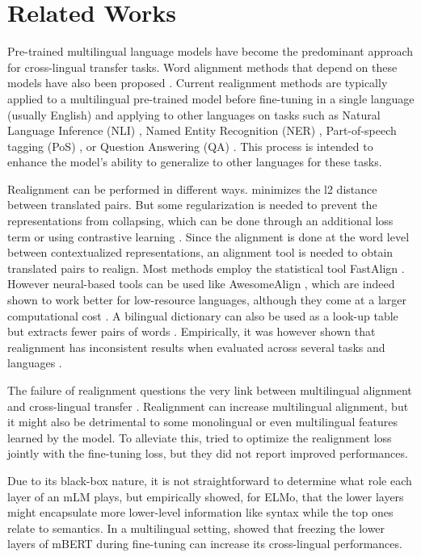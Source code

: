 \section{Related Works}
Pre-trained multilingual language models have become the predominant approach for cross-lingual transfer tasks. Word alignment methods that depend on these models have also been proposed \citep{jalili-sabet-etal-2020-simalign, nagata-etal-2020-supervised}. Current realignment methods are typically applied to a multilingual pre-trained model before fine-tuning in a single language (usually English) and applying to other languages on tasks such as Natural Language Inference (NLI) \citep{conneau-etal-2018-xnli}, Named Entity Recognition (NER) \citep{rahimi-etal-2019-massively}, Part-of-speech tagging (PoS) \citep{daniel2020universal}, or Question Answering (QA) \citep{artetxe-etal-2020-cross}. This process is intended to enhance the model's ability to generalize to other languages for these tasks.


Realignment can be performed in different ways. \citet{Cao2020Multilingual} minimizes the l2 distance between translated pairs. But some regularization is needed to prevent the representations from collapsing, which can be done through an additional loss term \citep{Cao2020Multilingual,zhao-etal-2021-inducing}
or using contrastive learning \citep{wu-dredze-2020-explicit}. Since the alignment is done at the word level between contextualized representations, an alignment tool is needed to obtain translated pairs to realign. Most methods employ the statistical tool FastAlign \citep{dyer-etal-2013-simple}. However neural-based tools can be used like AwesomeAlign \citep{dou-neubig-2021-word}, which are indeed shown to work better for low-resource languages, although they come at a larger computational cost \citep{ebrahimi-etal-2023-meeting}. A bilingual dictionary can also be used as a look-up table but extracts fewer pairs of words \citep{gaschi-etal-2023-exploring}. Empirically, it was however shown that realignment has inconsistent results when evaluated across several tasks and languages \citep{Efimov_2023,wu-dredze-2020-explicit}.

The failure of realignment questions the very link between multilingual alignment and cross-lingual transfer \citep{gaschi2022multilingual}. Realignment can increase multilingual alignment, but it might also be detrimental to some monolingual or even multilingual features learned by the model. To alleviate this, \citet{gaschi-etal-2023-exploring} tried to optimize the realignment loss jointly with the fine-tuning loss, but they did not report improved performances.

Due to its black-box nature, it is not straightforward to determine what role each layer of an mLM plays, but \citet{peters-etal-2018-deep} empirically showed, for ELMo, that the lower layers might encapsulate more lower-level information like syntax while the top ones relate to semantics. In a multilingual setting, \citet{wu-dredze-2019-beto} showed that freezing the lower layers of mBERT during fine-tuning can increase its cross-lingual performances.
